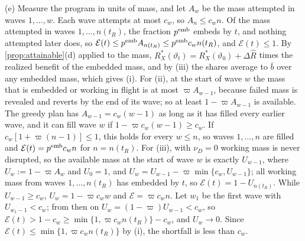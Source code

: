 (e) Measure the program in units of mass, and let $A_w$ be the mass attempted in waves $1,\dots,w$. Each wave attempts at most $c_w$, so $A_n\le c_wn$. Of the mass attempted in waves $1,\dots,n(t_R)$, the fraction $p^{\rm emb}$ embeds by $t$, and nothing attempted later does, so $\mathcal E(t)\le p^{\rm emb}A_{n(t_R)}\le p^{\rm emb}c_wn(t_R)$, and $\mathcal E(t)\le1$. By \autoref{prop:attainable}(d) applied to the mass, $R^*_X(\vartheta_t)=R^*_X(\vartheta_0)+\Delta\hat R$ times the realized benefit of the embedded mass, and by (iii) the shares average to $\bar b$ over any embedded mass, which gives (i). For (ii), at the start of wave $w$ the mass that is embedded or working in flight is at most $\varpi A_{w-1}$, because failed mass is revealed and reverts by the end of its wave; so at least $1-\varpi A_{w-1}$ is available. The greedy plan has $A_{w-1}=c_w(w-1)$ as long as it has filled every earlier wave, and it can fill wave $w$ if $1-\varpi c_w(w-1)\ge c_w$. If $c_w[1+\varpi(n-1)]\le1$, this holds for every $w\le n$, so waves $1,\dots,n$ are filled and $\mathcal E(t)=p^{\rm emb}c_wn$ for $n=n(t_R)$. For (iii), with $\nu_D=0$ working mass is never disrupted, so the available mass at the start of wave $w$ is exactly $U_{w-1}$, where $U_w:=1-\varpi A_w$ and $U_0=1$, and $U_w=U_{w-1}-\varpi\min\{c_w,U_{w-1}\}$; all working mass from waves $1,\dots,n(t_R)$ has embedded by $t$, so $\mathcal E(t)=1-U_{n(t_R)}$. While $U_{w-1}\ge c_w$, $U_w=1-\varpi c_ww$ and $\mathcal E=\varpi c_wn$. Let $w_1$ be the first wave with $U_{w_1-1}<c_w$; from then on $U_w=(1-\varpi)U_{w-1}<c_w$, so $\mathcal E(t)>1-c_w\ge\min\{1,\varpi c_wn(t_R)\}-c_w$, and $U_w\to0$. Since $\mathcal E(t)\le\min\{1,\varpi c_wn(t_R)\}$ by (i), the shortfall is less than $c_w$.

